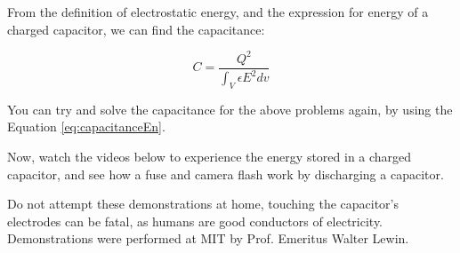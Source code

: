 \documentclass{ximera}
\begin{document}
From the definition of electrostatic energy, and the expression for energy of a charged capacitor, we can find the capacitance:

\begin{equation}
C=\frac{Q^2}{\int_V \epsilon E^2 dv} \label{eq:capacitanceEn}
\end{equation}

You can try and solve the capacitance for the above problems again, by using the Equation \ref{eq:capacitanceEn}.

Now, watch the  videos below to experience the energy stored in a charged capacitor, and see  how a fuse and camera flash work by discharging a capacitor.

Do not attempt these demonstrations at home, touching the capacitor's electrodes can be fatal, as humans are good conductors of electricity. Demonstrations were performed at MIT by Prof. Emeritus Walter Lewin.

\begin{center}  
\end{center}


\begin{center}  
\end{center} 
\end{document}
